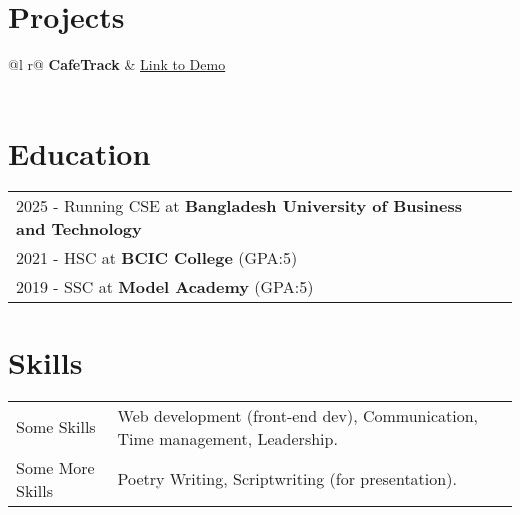 \documentclass[a4paper,12pt]{article}
\begin{document}
  
\section{Projects}

\begin{tabularx}{\linewidth}{ @{}l r@{} }
\textbf{CafeTrack} & \hfill \href{https://github.com/samia-homayara/Cafetrack}{Link to Demo} \\[3.75pt]
  \\
\end{tabularx}

\section{Education}
\begin{tabularx}{\linewidth}{@{}l X@{}}	
2025 - Running CSE at \textbf{Bangladesh University of Business and Technology} \hfill \normalsize  \\

2021 - HSC at \textbf{BCIC College} (GPA:5) \\ 

2019 - SSC at \textbf{Model Academy}  (GPA:5) \\

\end{tabularx}

\section{Skills}
\begin{tabularx}{\linewidth}{@{}l X@{}}
Some Skills &  \normalsize{Web development (front-end dev), Communication, Time management, Leadership.}\\
Some More Skills  &  \normalsize{Poetry Writing, Scriptwriting (for presentation).}\\  
\end{tabularx}

\vfill
{}
\end{document}
